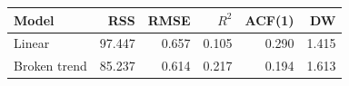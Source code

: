 \begin{tabular}{lrrrrr}
\toprule
Model & RSS & RMSE & $R^2$ & ACF(1) & DW \\
\midrule
Linear & 97.447 & 0.657 & 0.105 & 0.290 & 1.415 \\
Broken trend & 85.237 & 0.614 & 0.217 & 0.194 & 1.613 \\
\bottomrule
\end{tabular}
